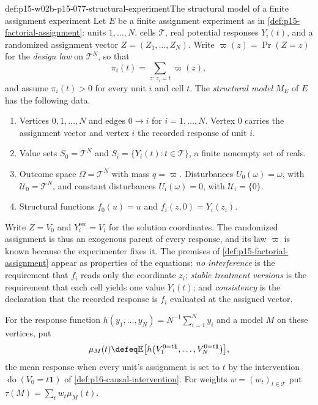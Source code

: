 \begin{hbdefinition}{def:p15-w02b-p15-077-structural-experiment}{The structural model of a finite assignment experiment}
Let \(E\) be a finite assignment experiment as in
\cref{def:p15-factorial-assignment}: units \(1,\ldots,N\), cells
\(\mathcal T\), real potential responses \(Y_i(t)\), and a randomized
assignment vector \(Z=(Z_1,\ldots,Z_N)\). Write
\(\varpi(z)=\Pr(Z=z)\) for the \emph{design law} on \(\mathcal T^N\),
so that
\[
 \pi_i(t)=\sum_{z:\,z_i=t}\varpi(z),
\]
and assume \(\pi_i(t)>0\) for every unit \(i\) and cell \(t\).
The \emph{structural model} \(M_E\) of \(E\) has the following data.
\begin{enumerate}
\item Vertices \(0,1,\ldots,N\) and edges \(0\to i\) for
      \(i=1,\ldots,N\). Vertex \(0\) carries the assignment vector and
      vertex \(i\) the recorded response of unit \(i\).
\item Value sets \(S_0=\mathcal T^N\) and
      \(S_i=\{Y_i(t):t\in\mathcal T\}\), a finite nonempty set of reals.
\item Outcome space \(\Omega=\mathcal T^N\) with mass
      \(q=\varpi\). Disturbances \(U_0(\omega)=\omega\), with
      \(\mathcal U_0=\mathcal T^N\), and constant disturbances
      \(U_i(\omega)=0\), with \(\mathcal U_i=\{0\}\).
\item Structural functions \(f_0(u)=u\) and
      \(f_i(z,0)=Y_i(z_i)\).
\end{enumerate}
Write \(Z=V_0\) and \(Y_i^{\mathrm{rec}}=V_i\) for the solution
coordinates. The randomized assignment is thus an exogenous parent of every
response, and its law \(\varpi\) is known because the experimenter fixes it.
The premises of \cref{def:p15-factorial-assignment} appear as properties of
the equations: \emph{no interference} is the requirement that \(f_i\)
reads only the coordinate \(z_i\); \emph{stable treatment versions} is
the requirement that each cell yields one value \(Y_i(t)\); and
\emph{consistency} is the declaration that the recorded response is
\(f_i\) evaluated at the assigned vector.
\end{hbdefinition}

For the response function
\(h(y_1,\ldots,y_N)=N^{-1}\sum_{i=1}^Ny_i\) and a model \(M\) on
these vertices, put
\[
 \mu_M(t)\defeq\mathbb E\bigl[h\bigl(V_1^{0=t\mathbf 1},\ldots,
   V_N^{0=t\mathbf 1}\bigr)\bigr],
\]
the mean response when every unit's assignment is set to \(t\) by the
intervention \(\operatorname{do}(V_0=t\mathbf 1)\) of
\cref{def:p16-causal-intervention}. For weights \(w=(w_t)_{t\in\mathcal T}\)
put \(\tau(M)=\sum_tw_t\mu_M(t)\).

